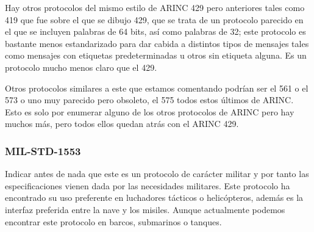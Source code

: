 Hay otros protocolos del mismo estilo de ARINC 429 pero anteriores tales
como 419 que fue sobre el que se dibujo 429, que se trata de un protocolo
parecido en el que se incluyen palabras de 64 bits, así como palabras de 32;
este protocolo es bastante menos estandarizado para dar cabida a distintos
tipos de mensajes tales como mensajes con etiquetas predeterminadas u otros
sin etiqueta alguna. Es un protocolo mucho menos claro que el 429.

Otros protocolos similares a este que estamos comentando podrían ser el 561
o el 573 o uno muy parecido pero obsoleto, el 575 todos estos últimos de
ARINC. Esto es solo por enumerar alguno de los otros protocolos de ARINC
pero hay muchos más, pero todos ellos quedan atrás con el ARINC 429.

\subsubsection{MIL-STD-1553}
\label{sec:01.02.MIL.STD.1553}

Indicar antes de nada que este es un protocolo de carácter militar y por tanto
las especificaciones vienen dada por las necesidades militares. Este protocolo
ha encontrado su uso preferente en luchadores tácticos o helicópteros, además
es la interfaz preferida entre la nave y los misiles. Aunque actualmente
podemos encontrar este protocolo en barcos, submarinos o tanques.




